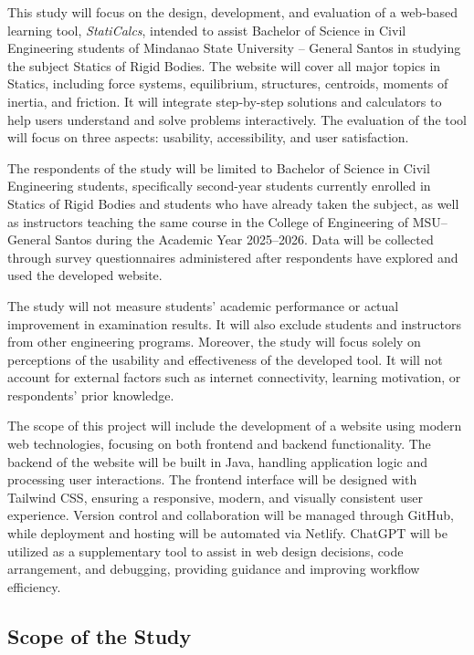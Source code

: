 This study will focus on the design, development, and evaluation of a web-based learning tool, \textit{StatiCalcs}, intended to assist Bachelor of Science in Civil Engineering students of Mindanao State University -- General Santos in studying the subject Statics of Rigid Bodies. The website will cover all major topics in Statics, including force systems, equilibrium, structures, centroids, moments of inertia, and friction. It will integrate step-by-step solutions and calculators to help users understand and solve problems interactively. The evaluation of the tool will focus on three aspects: usability, accessibility, and user satisfaction.

The respondents of the study will be limited to Bachelor of Science in Civil Engineering students, specifically second-year students currently enrolled in Statics of Rigid Bodies and students who have already taken the subject, as well as instructors teaching the same course in the College of Engineering of MSU--General Santos during the Academic Year 2025--2026. Data will be collected through survey questionnaires administered after respondents have explored and used the developed website.

The study will not measure students' academic performance or actual improvement in examination results. It will also exclude students and instructors from other engineering programs. Moreover, the study will focus solely on perceptions of the usability and effectiveness of the developed tool. It will not account for external factors such as internet connectivity, learning motivation, or respondents' prior knowledge.


The scope of this project will include the development of a website using modern web technologies, focusing on both frontend and backend functionality. The backend of the website will be built in Java, handling application logic and processing user interactions. The frontend interface will be designed with Tailwind CSS, ensuring a responsive, modern, and visually consistent user experience. Version control and collaboration will be managed through GitHub, while deployment and hosting will be automated via Netlify. ChatGPT will be utilized as a supplementary tool to assist in web design decisions, code arrangement, and debugging, providing guidance and improving workflow efficiency.

\subsection*{Scope of the Study}

